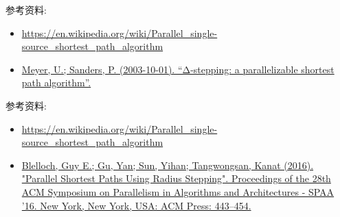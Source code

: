 \documentclass[a4paper, justified]{tufte-handout}
\begin{document}
\beginot
\begin{ot}

	\noindent 参考资料:
	\begin{itemize}
		\item \href{https://en.wikipedia.org/wiki/Parallel_single-source_shortest_path_algorithm}{https://en.wikipedia.org/wiki/Parallel\_single-source\_shortest\_path\_algorithm}
		\item 	\href{https://www.sciencedirect.com/science/article/pii/S0196677403000762?via\%3Dihub} {Meyer, U.; Sanders, P. (2003-10-01). ``Δ-stepping: a parallelizable shortest path algorithm''. }
	\end{itemize}


\end{ot}


\begin{ot}

	\noindent 参考资料:
	\begin{itemize}
		\item \href{https://en.wikipedia.org/wiki/Parallel_single-source_shortest_path_algorithm}{https://en.wikipedia.org/wiki/Parallel\_single-source\_shortest\_path\_algorithm}
		\item \href{https://dl.acm.org/doi/10.1145/2935764.2935765} {Blelloch, Guy E.; Gu, Yan; Sun, Yihan; Tangwongsan, Kanat (2016). "Parallel Shortest Paths Using Radius Stepping". Proceedings of the 28th ACM Symposium on Parallelism in Algorithms and Architectures - SPAA '16. New York, New York, USA: ACM Press: 443–454.}
	\end{itemize}

\end{ot}





% 
\end{document}
